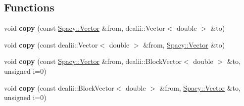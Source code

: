 \subsection*{\-Functions}
\begin{DoxyCompactItemize}
\item 
\hypertarget{namespaceSpacy_1_1dealII_a04fe7dee5a1cae496f7cea1bedf55436}{void {\bfseries copy} (const \hyperlink{classSpacy_1_1Vector}{\-Spacy\-::\-Vector} \&from, dealii\-::\-Vector$<$ double $>$ \&to)}\label{namespaceSpacy_1_1dealII_a04fe7dee5a1cae496f7cea1bedf55436}

\item 
\hypertarget{namespaceSpacy_1_1dealII_a06a29e6248e96f10f5f280a8d1ef2664}{void {\bfseries copy} (const dealii\-::\-Vector$<$ double $>$ \&from, \hyperlink{classSpacy_1_1Vector}{\-Spacy\-::\-Vector} \&to)}\label{namespaceSpacy_1_1dealII_a06a29e6248e96f10f5f280a8d1ef2664}

\item 
\hypertarget{namespaceSpacy_1_1dealII_a54dc2b5650da4d44ac0ec06ba2eefe13}{void {\bfseries copy} (const \hyperlink{classSpacy_1_1Vector}{\-Spacy\-::\-Vector} \&from, dealii\-::\-Block\-Vector$<$ double $>$ \&to, unsigned i=0)}\label{namespaceSpacy_1_1dealII_a54dc2b5650da4d44ac0ec06ba2eefe13}

\item 
\hypertarget{namespaceSpacy_1_1dealII_a6499e13e539f514fe25ea832955ee161}{void {\bfseries copy} (const dealii\-::\-Block\-Vector$<$ double $>$ \&from, \hyperlink{classSpacy_1_1Vector}{\-Spacy\-::\-Vector} \&to, unsigned i=0)}\label{namespaceSpacy_1_1dealII_a6499e13e539f514fe25ea832955ee161}


\end{DoxyCompactItemize}
